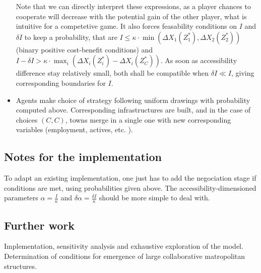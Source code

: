\begin{itemize}
Note that we can directly interpret these expressions, as a player chances to cooperate will decrease with the potential gain of the other player, what is intuitive for a competetive game. It also forces feasability conditions on $I$ and $\delta I$ to keep a probability, that are $I \leq \kappa\cdot \min(\Delta X_1(Z^{\ast}_1),\Delta X_2(Z^{\ast}_2))$ (binary positive cost-benefit conditions) and $I-\delta I > \kappa \cdot \max_i (\Delta X_i(Z^{\ast}_i)-\Delta X_i(Z^{\ast}_C))$. As soon as accessibility difference stay relatively small, both shall be compatible when $\delta I \ll I$, giving corresponding boundaries for $I$.

\item Agents make choice of strategy following uniform drawings with probability computed above. Corresponding infrastructures are built, and in the case of choices $(C,C)$, towns merge in a single one with new corresponding variables (employment, actives, etc. ).


\end{itemize}



\subsection*{Notes for the implementation}

To adapt an existing implementation, one just has to add the negociation stage if conditions are met, using probabilities given above. The accessibility-dimensioned parameters $\alpha = \frac{I}{\kappa}$ and $\delta \alpha = \frac{\delta I}{\kappa}$ should be more simple to deal with.



\subsection*{Further work}

Implementation, sensitivity analysis and exhaustive exploration of the model. Determination of conditions for emergence of large collaborative matropolitan structures.








